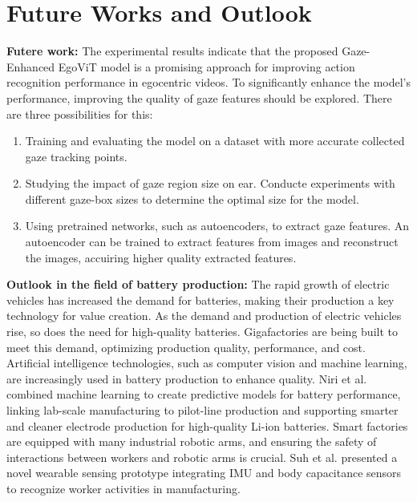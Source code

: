 \section{Future Works and Outlook}
\label{sec:future_work}
\textbf{Futere work:} The experimental results indicate that the proposed Gaze-Enhanced EgoViT model is a promising approach for improving action recognition performance in egocentric videos. To significantly enhance the model's performance, improving the quality of gaze features should be explored. There are three possibilities for this:
\begin{enumerate}
    \item Training and evaluating the model on a dataset with more accurate collected gaze tracking points.
    \item Studying the impact of gaze region size on \gls{ear}. Conducte experiments with different gaze-box sizes to determine the optimal size for the model.
    \item Using pretrained networks, such as autoencoders, to extract gaze features. An autoencoder can be trained to extract features from images and reconstruct the images, accuiring higher quality extracted features.
\end{enumerate}

\textbf{Outlook in the field of battery production:} The rapid growth of electric vehicles has increased the demand for batteries, making their production a key technology for value creation. As the demand and production of electric vehicles rise, so does the need for high-quality batteries. Gigafactories are being built to meet this demand, optimizing production quality, performance, and cost. Artificial intelligence technologies, such as computer vision and machine learning, are increasingly used in battery production to enhance quality. Niri et al. \cite{niri2021machine} combined machine learning to create predictive models for battery performance, linking lab-scale manufacturing to pilot-line production and supporting smarter and cleaner electrode production for high-quality Li-ion batteries. Smart factories are equipped with many industrial robotic arms, and ensuring the safety of interactions between workers and robotic arms is crucial. Suh et al. \cite{suh2023workeractivityrecognitionmanufacturing} presented a novel wearable sensing prototype integrating IMU and body capacitance sensors to recognize worker activities in manufacturing.

